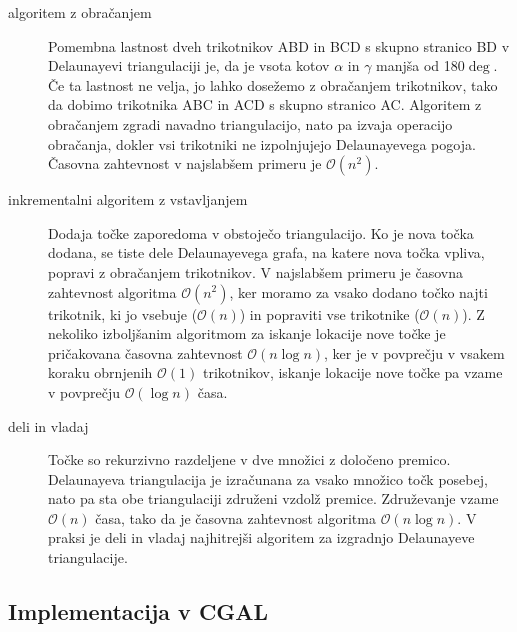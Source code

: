\documentclass[a4paper, 12pt]{book}
\newcommand{\OO}{\ensuremath{\mathcal{O}}} %
\begin{document}
\begin{description}
\item[algoritem z obračanjem] Pomembna lastnost dveh trikotnikov ABD in BCD s skupno stranico BD v Delaunayevi triangulaciji je, da je vsota kotov $\alpha$ in $\gamma$ manjša od 180$\deg $. Če ta lastnost ne velja, jo lahko dosežemo z obračanjem trikotnikov, tako da dobimo trikotnika ABC in ACD s skupno stranico AC. Algoritem z obračanjem zgradi navadno triangulacijo, nato pa izvaja operacijo obračanja, dokler vsi trikotniki ne izpolnjujejo Delaunayevega pogoja. Časovna zahtevnost v najslabšem primeru je $\OO(n^2)$.
\item[inkrementalni algoritem z vstavljanjem] Dodaja točke zaporedoma v obstoječo triangulacijo. Ko je nova točka dodana, se tiste dele Delaunayevega grafa, na katere nova točka vpliva, popravi z obračanjem trikotnikov. V najslabšem primeru je časovna zahtevnost algoritma $\OO(n^2)$, ker moramo za vsako dodano točko najti trikotnik, ki jo vsebuje ($\OO(n)$) in popraviti vse trikotnike ($\OO(n)$). Z nekoliko izboljšanim algoritmom za iskanje lokacije nove točke je pričakovana časovna zahtevnost $\OO(n\log n)$, ker je v povprečju v vsakem koraku obrnjenih $\OO(1)$ trikotnikov, iskanje lokacije nove točke pa vzame v povprečju $\OO(\log n)$ časa.
\item[deli in vladaj] Točke so rekurzivno razdeljene v dve množici z določeno premico. Delaunayeva triangulacija je izračunana za vsako množico točk posebej, nato pa sta obe triangulaciji združeni vzdolž premice. Združevanje vzame $\OO(n)$ časa, tako da je časovna zahtevnost algoritma $\OO(n\log n)$. V praksi je deli in vladaj najhitrejši algoritem za izgradnjo Delaunayeve triangulacije.
\end{description}

\subsection{Implementacija v CGAL}
\end{document}
